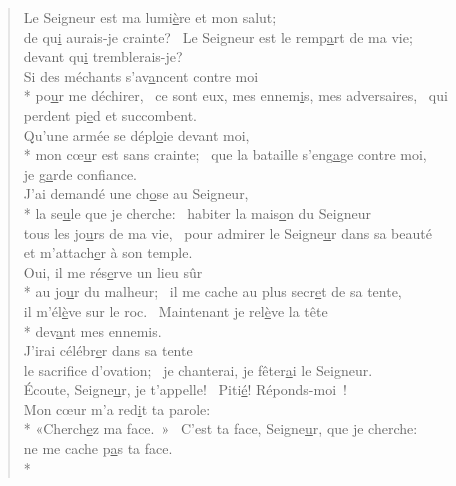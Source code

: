 
\begin{verse}
Le Seigneur est ma lumi\underline{è}re et mon salut; \\
de qu\underline{i} aurais-je crainte?~\psalmstar
Le Seigneur est le remp\underline{a}rt de ma vie; \\
devant qu\underline{i} tremblerais-je? \\

Si des méchants s’av\underline{a}ncent contre moi \\*
po\underline{u}r me déchirer,~\psalmdagger
ce sont eux, mes ennem\underline{i}s, mes adversaires,~\psalmstar
qui perdent pi\underline{e}d et succombent. \\

Qu’une armée se dépl\underline{o}ie devant moi, \\*
mon cœ\underline{u}r est sans crainte;~\psalmstar
que la bataille s’eng\underline{a}ge contre moi, \\
je g\underline{a}rde confiance. \\

J’ai demandé une ch\underline{o}se au Seigneur, \\*
la se\underline{u}le que je cherche:~\psalmdagger
habiter la mais\underline{o}n du Seigneur \\
tous les jo\underline{u}rs de ma vie,~\psalmstar
pour admirer le Seigne\underline{u}r dans sa beauté \\
et m’attach\underline{e}r à son temple. \\

Oui, il me rés\underline{e}rve un lieu sûr \\*
au jo\underline{u}r du malheur;~\psalmdagger
il me cache au plus secr\underline{e}t de sa tente, \\
il m’él\underline{è}ve sur le roc.~\psalmstar
{}Maintenant je rel\underline{è}ve la tête \\*
dev\underline{a}nt mes ennemis. \\

J’irai célébr\underline{e}r dans sa tente \\
le sacrif\underline{i}ce d’ovation;~\psalmstar
je chanterai, je fêter\underline{a}i le Seigneur. \\

Écoute, Seigne\underline{u}r, je t’appelle!~\psalmstar
Piti\underline{é}! Réponds-moi ! \\
Mon cœur m’a red\underline{i}t ta parole: \\*
«Cherch\underline{e}z ma face. »~\psalmstar
C’est ta face, Seigne\underline{u}r, que je cherche: \\
ne me cache p\underline{a}s ta face. \\*


\end{verse}
